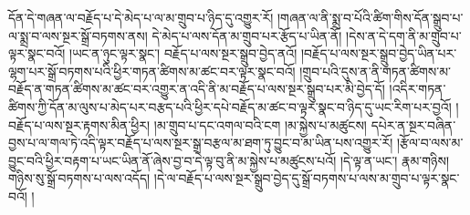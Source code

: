དོན་དེ་གཞན་ལ་བརྗོད་པ་དེ་མེད་པ་ལ་མ་གྲུབ་པ་ཉིད་དུ་འགྱུར་རོ། །གཞན་ལ་ནི་སྨྲ་བ་པོའི་ཚིག་གིས་དོན་སྒྲུབ་པ་ལ་སྨྲ་བ་ལས་སྔར་སྒྲོ་བཏགས་ནས། དེ་མེད་པ་ལས་དོན་མ་གྲུབ་པར་རྩོད་པ་ཡིན་ནོ། །དེས་ན་དེ་དག་ནི་མ་གྲུབ་པ་ལྟར་སྣང་བའོ། །ཡང་ན་ཉུང་ལྟར་སྣང་། བརྗོད་པ་ལས་སྔར་སྒྲུབ་བྱེད་ནའོ། །བརྗོད་པ་ལས་སྔར་སྒྲུབ་བྱེད་ཡིན་པར་ལྷག་པར་སྒྲོ་བཏགས་པའི་ཕྱིར་གཏན་ཚིགས་མ་ཚང་བར་ལྟར་སྣང་བའོ། །གྲུབ་པའི་དུས་ན་ནི་གཏན་ཚིགས་མ་བརྗོད་ན་གཏན་ཚིགས་མ་ཚང་བར་འགྱུར་ན་འདི་ནི་མ་བརྗོད་པ་ལས་སྔར་སྒྲུབ་པར་མི་བྱེད་དོ། །འདིར་གཏན་ཚིགས་ཀྱི་དོན་མ་ལུས་པ་མེད་པར་བརྩད་པའི་ཕྱིར་དཔེ་བརྗོད་མ་ཚང་བ་ལྟར་སྣང་བ་ཉིད་དུ་ཡང་རིག་པར་བྱའོ། །བརྗོད་པ་ལས་སྔར་རྟགས་མིན་ཕྱིར། །མ་གྲུབ་པ་དང་འགལ་བའི་ངག །མ་སྐྱེས་པ་མཚུངས། དཔེར་ན་སྔར་བཞིན་བྱས་པ་ལ་གལ་ཏེ་འདི་ལྟར་བརྗོད་པ་ལས་སྔར་སྒྲ་བརྩལ་མ་ཐག་ཏུ་བྱུང་བ་མ་ཡིན་པས་འགྱུར་རོ། །རྩོལ་བ་ལས་མ་བྱུང་བའི་ཕྱིར་བརྟག་པ་ཡང་ཡིན་ནོ་ཞེས་བྱ་བ་དེ་ལྟ་བུ་ནི་མ་སྐྱེས་པ་མཚུངས་པའོ། །དེ་ལྟ་ན་ཡང་། རྣམ་གཉིས། གཉིས་སུ་སྒྲོ་བཏགས་པ་ལས་འདོད། །དེ་ལ་བརྗོད་པ་ལས་སྔར་སྒྲུབ་བྱེད་དུ་སྒྲོ་བཏགས་པ་ལས་མ་གྲུབ་པ་ལྟར་སྣང་བའོ། །
